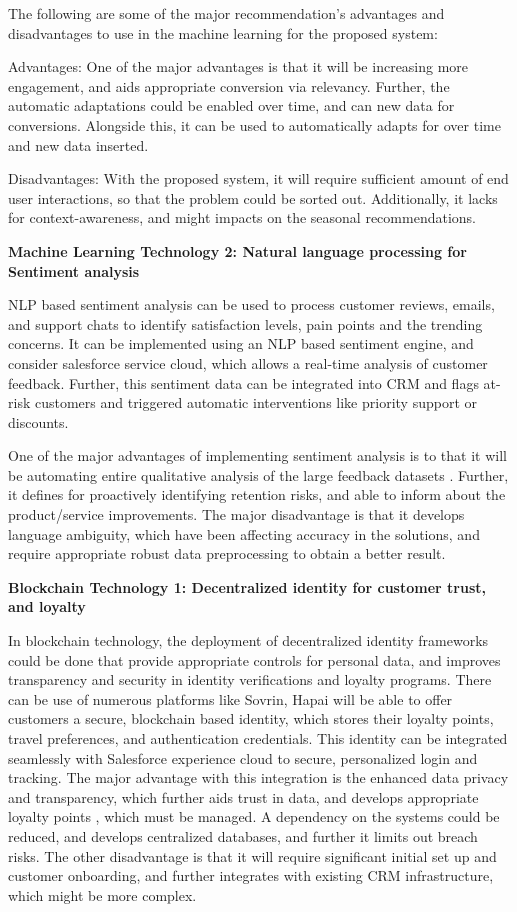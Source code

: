 \documentclass{article}
\begin{document}
The following are some of the major recommendation’s advantages and disadvantages to use in the machine learning for the proposed system:

Advantages:
One of the major advantages is that it will be increasing more engagement, and aids appropriate conversion via relevancy. Further, the automatic adaptations could be enabled over time, and can new data for conversions. Alongside this, it can be used to automatically adapts for over time and new data inserted. 

Disadvantages:
With the proposed system, it will require sufficient amount of end user interactions, so that the problem could be sorted out. Additionally, it lacks for context-awareness, and might impacts on the seasonal recommendations. 

\textbf{Machine Learning Technology 2: Natural language processing for Sentiment analysis}

NLP based sentiment analysis can be used to process customer reviews, emails, and support chats to identify satisfaction levels, pain points and the trending concerns. It can be implemented using an NLP based sentiment engine, and consider salesforce service cloud, which allows a real-time analysis of customer feedback. Further, this sentiment data can be integrated into CRM and flags at-risk customers and triggered automatic interventions like priority support or discounts. 

One of the major advantages of implementing sentiment analysis is to that it will be automating entire qualitative analysis of the large feedback datasets \cite{shad_natural_2024}. Further, it defines for proactively identifying retention risks, and able to inform about the product/service improvements. The major disadvantage is that it develops language ambiguity, which have been affecting accuracy in the solutions, and require appropriate robust data preprocessing to obtain a better result.

\textbf{Blockchain Technology 1: Decentralized identity for customer trust, and loyalty}

In blockchain technology, the deployment of decentralized identity frameworks could be done that provide appropriate controls for personal data, and improves transparency and security in identity verifications and loyalty programs. There can be use of numerous platforms like Sovrin, Hapai will be able to offer customers a secure, blockchain based identity, which stores their loyalty points, travel preferences, and authentication credentials. This identity can be integrated seamlessly with Salesforce experience cloud to secure, personalized login and tracking. The major advantage with this integration is the enhanced data privacy and transparency, which further aids trust in data, and develops appropriate loyalty points \cite{tripathi_comprehensive_2023}, which must be managed. A dependency on the systems could be reduced, and develops centralized databases, and further it limits out breach risks. The other disadvantage is that it will require significant initial set up and customer onboarding, and further integrates with existing CRM infrastructure, which might be more complex. 
\end{document}
